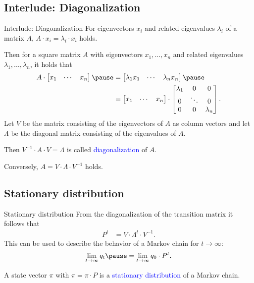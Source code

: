 \documentclass{beamer}
\def\spadding{\vspace{0.25cm}}
\def\b{\textcolor{blue}}
\begin{document}
\subsection{Interlude: Diagonalization}
\begin{frame}{Interlude: Diagonalization}
    For eigenvectors $x_i$ and related eigenvalues $\lambda_i$ of a matrix $A$, $A \cdot x_i = \lambda_i \cdot x_i$ holds.\pause\par\spadding
    Then for a square matrix $A$ with eigenvectors $x_1, \dots, x_n$ and related eigenvalues $\lambda_1, \dots, \lambda_n$\pause, it holds that
    \begin{align*}
        A \cdot \begin{bmatrix}
            x_1 & \cdots & x_n
        \end{bmatrix}\pause &= \begin{bmatrix}
            \lambda_1 x_1 & \cdots & \lambda_n x_n
        \end{bmatrix}\pause \\
        &= \begin{bmatrix}
            x_1 & \cdots & x_n
        \end{bmatrix} \cdot \begin{bmatrix}
            \lambda_1 & 0 & 0 \\
            0 & \ddots & 0 \\
            0 & 0 & \lambda_n
        \end{bmatrix}.
    \end{align*}\pause
    Let $V$ be the matrix consisting of the eigenvectors of $A$ as column vectors and let $\Lambda$ be the diagonal matrix consisting of the eigenvalues of $A$.\pause\par\spadding
    Then $V^{-1} \cdot A \cdot V = \Lambda$ is called \b{diagonalization} of $A$.\pause\par
    Conversely, $A = V \cdot \Lambda \cdot V^{-1}$ holds.
\end{frame}

\subsection{Stationary distribution}
\begin{frame}{Stationary distribution}
    From the diagonalization of the transition matrix it follows that
    \begin{align*}
                                     P^t &= V \cdot \Lambda^t \cdot V^{-1}.
    \end{align*}\pause
    This can be used to describe the behavior of a Markov chain for $t \to \infty$:
    \begin{align*}
        \lim_{t \to \infty} q_t\pause = \lim_{t \to \infty} q_0 \cdot P^t.
    \end{align*}\pause
    \begin{definition}
        A state vector $\pi$ with $\pi = \pi \cdot P$ is a \b{stationary distribution} of a Markov chain.
    \end{definition}
\end{frame}
\end{document}
